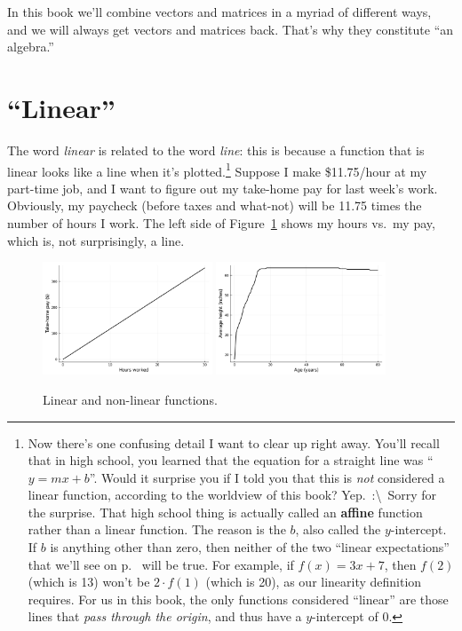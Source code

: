 In this book we'll combine vectors and matrices in a myriad of different ways,
and we will always get vectors and matrices back. That's why they constitute
``an algebra.''

\section{``Linear''}


The word \textit{linear} is related to the word \textit{line}: this is because
a function that is linear looks like a line when it's plotted.\footnote{Now
there's one confusing detail I want to clear up right away. You'll recall that
in high school, you learned that the equation for a straight line was
 ``$y=mx+b$''. Would it surprise you if I told you that
this is \textit{not} considered a linear function, according to the worldview
of this book? Yep.~:\textbackslash~Sorry for the surprise. That high school
thing is actually called an  \textbf{affine} function
rather than a linear function. The reason is the $b$, also called the
 $y$-intercept. If $b$ is anything other than
zero, then neither of the two ``linear expectations'' that we'll see on
p.~\pageref{linearExpectations} will be true. For example, if $f(x)=3x+7$, then
$f(2)$ (which is 13) won't be $2\cdot f(1)$ (which is 20), as our linearity
definition requires. For us in this book, the only functions considered
``linear'' are those lines that  \textit{pass through the
origin}, and thus have a $y$-intercept of 0.} Suppose I make \$11.75/hour at my
part-time job, and I want to figure out my take-home pay for last week's work.
Obviously, my paycheck (before taxes and what-not) will be 11.75 times the
number of hours I work. The left side of Figure~\ref{fig:linearNLPlots} shows
my hours vs.~my pay, which is, not surprisingly, a line.

\begin{figure}[ht]
\centering
\includegraphics[width=0.45\textwidth]{linear.png}
\includegraphics[width=0.45\textwidth]{nonlinear.png}
\caption{Linear and non-linear functions.}
\label{fig:linearNLPlots}
\end{figure}

